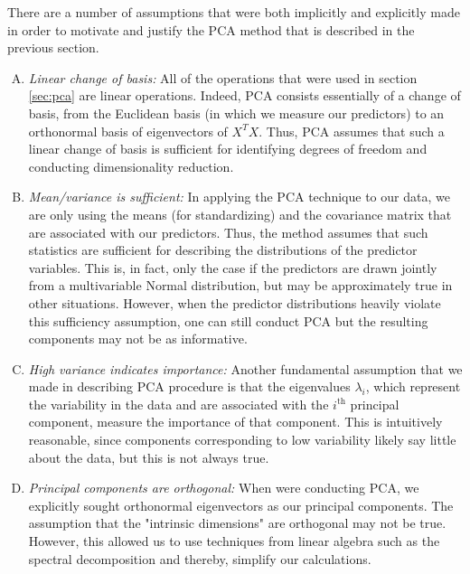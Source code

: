 \documentclass[12pt,letterpaper]{article}
\begin{document}
There are a number of assumptions that were both implicitly and explicitly made in order to motivate and justify the PCA method that is described in the previous section.
\begin{enumerate}[A.]
\item  \emph{Linear change of basis:} All of the operations that were used in section \ref{sec:pca}  are linear operations. Indeed, PCA consists essentially of a change of basis, from the Euclidean basis (in which we measure our predictors) to an orthonormal basis of eigenvectors of $X^T X$. Thus, PCA assumes that such a linear change of basis is sufficient for identifying degrees of freedom and conducting dimensionality reduction.

\item \emph{Mean/variance is sufficient:} In applying the PCA technique to our data, we are only using the means (for standardizing) and the covariance matrix that are associated with our predictors. Thus, the method assumes that such statistics are sufficient for describing the distributions of the predictor variables. This is, in fact, only the case if the predictors are drawn jointly from a multivariable Normal distribution, but may be approximately true in other situations. However, when the predictor distributions heavily violate this sufficiency assumption, one can still conduct PCA but the resulting components may not be as informative.

\item \emph{High variance indicates importance:} Another fundamental assumption that we made in describing PCA procedure is that the eigenvalues $\lambda_i$, which represent the variability in the data and are associated with the $i^\text{th}$ principal component, measure the importance of that component. This is intuitively reasonable, since components corresponding to low variability likely say little about the data, but this is not always true.

\item \emph{Principal components are orthogonal:} When were conducting PCA, we explicitly sought orthonormal eigenvectors as our principal components. The assumption that the "intrinsic dimensions" are orthogonal   may not be true. However, this allowed us to use techniques from linear algebra such as the spectral decomposition and thereby, simplify our calculations.
\end{enumerate}
\end{document}

